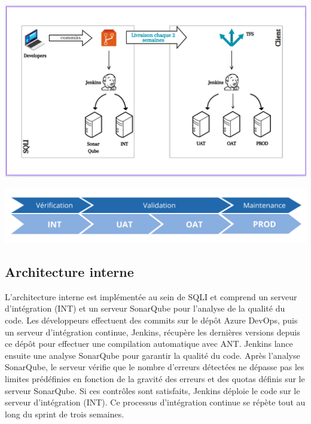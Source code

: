 \begin{center}
    \centering
    \includegraphics[width=19cm]{Figures/Test.png}
    \label{fig:processus}
\end{center}
\begin{center}
    \centering
    \includegraphics[width=19cm]{Figures/UAT.png}
    \label{fig:processus}
\end{center}



\subsection{Architecture interne}
L'architecture interne est implémentée au sein de SQLI et comprend un serveur d'intégration (INT) et un serveur SonarQube pour l'analyse de la qualité du code. Les développeurs effectuent des commits sur le dépôt Azure DevOps, puis un serveur d'intégration continue, Jenkins, récupère les dernières versions depuis ce dépôt pour effectuer une compilation automatique avec ANT. Jenkins lance ensuite une analyse SonarQube pour garantir la qualité du code. Après l'analyse SonarQube, le serveur vérifie que le nombre d'erreurs détectées ne dépasse pas les limites prédéfinies en fonction de la gravité des erreurs et des quotas définis sur le serveur SonarQube. Si ces contrôles sont satisfaits, Jenkins déploie le code sur le serveur d'intégration (INT). Ce processus d'intégration continue se répète tout au long du sprint de trois semaines.


